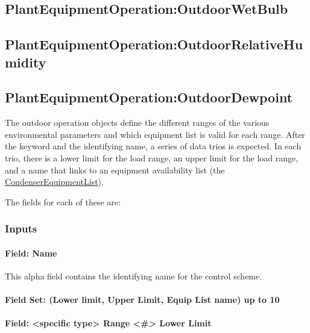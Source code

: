 \subsection{PlantEquipmentOperation:OutdoorWetBulb}\label{plantequipmentoperationoutdoorwetbulb}

\subsection{PlantEquipmentOperation:OutdoorRelativeHumidity}\label{plantequipmentoperationoutdoorrelativehumidity}

\subsection{PlantEquipmentOperation:OutdoorDewpoint}\label{plantequipmentoperationoutdoordewpoint}

The outdoor operation objects define the different ranges of the various environmental parameters and which equipment list is valid for each range. After the keyword and the identifying name, a series of data trios is expected. In each trio, there is a lower limit for the load range, an upper limit for the load range, and a name that links to an equipment availability list (the \hyperref[condenserequipmentlist]{CondenserEquipmentList}).

The fields for each of these are:

\subsubsection{Inputs}\label{inputs-8-015}

\paragraph{Field: Name}\label{field-name-4-019}

This alpha field contains the identifying name for the control scheme.

\paragraph{Field Set: (Lower limit, Upper Limit, Equip List name) up to 10}\label{field-set-lower-limit-upper-limit-equip-list-name-up-to-10-1}

\paragraph{Field: \textless{}specific type\textgreater{} Range \textless{}\#\textgreater{} Lower Limit}\label{field-specific-type-range-lower-limit}

